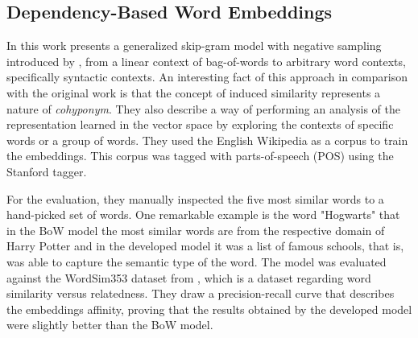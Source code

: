 \subsection{Dependency-Based Word Embeddings}

In this work  presents a generalized skip-gram model with negative sampling introduced by , from a linear context of bag-of-words to arbitrary word contexts, specifically syntactic contexts. An interesting fact of this approach in comparison with the original work is that the concept of induced similarity represents a nature of \textit{cohyponym}. They also describe a way of performing an analysis of the representation learned in the vector space by exploring the contexts of specific words or a group of words.
They used the English Wikipedia as a corpus to train the embeddings. This corpus was tagged with parts-of-speech (POS) using the Stanford tagger. 

For the evaluation, they manually inspected the five most similar words to a hand-picked set of words. One remarkable example is the word "Hogwarts" that in the BoW model the most similar words are from the respective domain of Harry Potter and in the developed model it was a list of famous schools, that is, was able to capture the semantic type of the word.
The model was evaluated against the WordSim353 dataset from , which is a dataset regarding word similarity versus relatedness. They draw a precision-recall curve that describes the embeddings affinity, proving that the results obtained by the developed model were slightly better than the BoW model.


